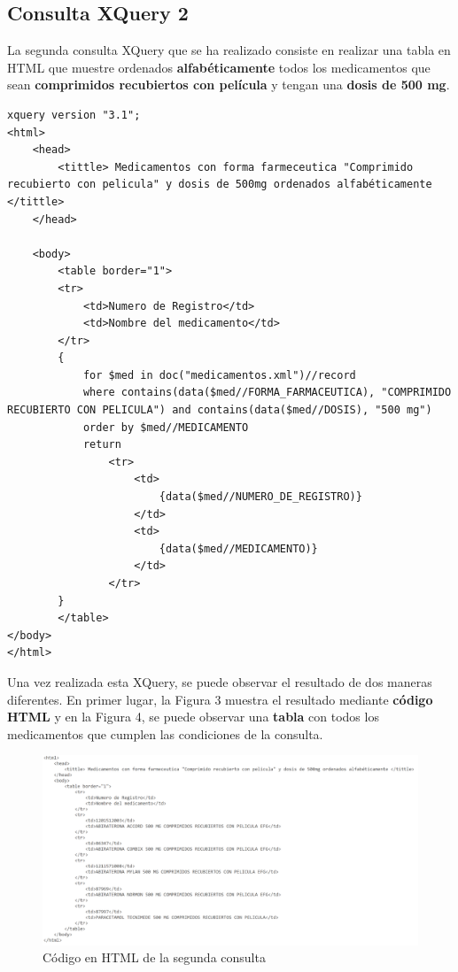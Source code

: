 \documentclass[../main.tex]{subfiles}
\begin{document}
\newpage

\subsection{Consulta XQuery 2}
La segunda consulta XQuery que se ha realizado consiste en realizar una tabla en HTML que muestre ordenados \textbf{alfabéticamente} todos los medicamentos que sean \textbf{comprimidos recubiertos con película} y tengan una \textbf{dosis de 500 mg}.


\begin{lstlisting}
xquery version "3.1";
<html>
    <head>
        <tittle> Medicamentos con forma farmeceutica "Comprimido recubierto con pelicula" y dosis de 500mg ordenados alfabéticamente </tittle>
    </head>
    
    <body>
        <table border="1">
        <tr>
            <td>Numero de Registro</td>
            <td>Nombre del medicamento</td>
        </tr>
        {
            for $med in doc("medicamentos.xml")//record
            where contains(data($med//FORMA_FARMACEUTICA), "COMPRIMIDO RECUBIERTO CON PELICULA") and contains(data($med//DOSIS), "500 mg")
            order by $med//MEDICAMENTO
            return 
                <tr> 
                    <td> 
                        {data($med//NUMERO_DE_REGISTRO)}
                    </td>
                    <td>
                        {data($med//MEDICAMENTO)}
                    </td>
                </tr>
        }
        </table>
</body>
</html>

\end{lstlisting}

Una vez realizada esta XQuery, se puede observar el resultado de dos maneras diferentes. En primer lugar, la Figura 3 muestra el resultado mediante \textbf{código HTML} y en la Figura 4, se puede observar una \textbf{tabla} con todos los medicamentos que cumplen las condiciones de la consulta.

\begin{figure}[h]
    \centering
    \includegraphics[scale=0.25]{images/xquery_2_html.png}
    \caption{Código en HTML de la segunda consulta}
    \label{fig:mesh1}
\end{figure}
\end{document}
